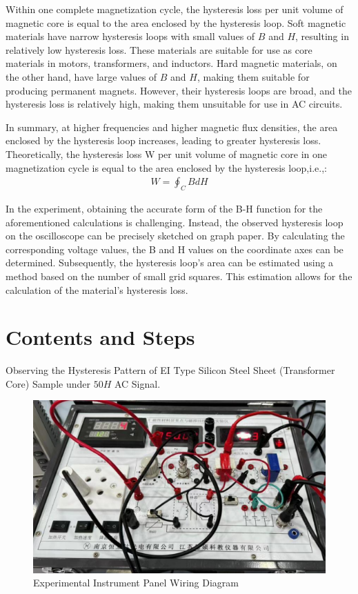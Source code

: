 \documentclass[UTF8]{article}
\begin{document}
      Within one complete magnetization cycle, the hysteresis loss per unit volume of magnetic core is equal to the area enclosed by the hysteresis loop. Soft magnetic materials have narrow hysteresis loops with small values of $B$ and $H$, resulting in relatively low hysteresis loss. These materials are suitable for use as core materials in motors, transformers, and inductors. Hard magnetic materials, on the other hand, have large values of $B$ and $H$, making them suitable for producing permanent magnets. However, their hysteresis loops are broad, and the hysteresis loss is relatively high, making them unsuitable for use in AC circuits.
      
      In summary, at higher frequencies and higher magnetic flux densities, the area enclosed by the hysteresis loop increases, leading to greater hysteresis loss. Theoretically, the hysteresis loss W per unit volume of magnetic core in one magnetization cycle is equal to the area enclosed by the hysteresis loop,i.e.,:
      \begin{eqnarray}
      W = \oint_{C}B dH
      \end{eqnarray}
      
      In the experiment, obtaining the accurate form of the B-H function for the aforementioned calculations is challenging. Instead, the observed hysteresis loop on the oscilloscope can be precisely sketched on graph paper. By calculating the corresponding voltage values, the B and H values on the coordinate axes can be determined. Subsequently, the hysteresis loop's area can be estimated using a method based on the number of small grid squares. This estimation allows for the calculation of the material's hysteresis loss.
      
               
	\section{Contents and Steps}

	Observing the Hysteresis Pattern of EI Type Silicon Steel Sheet (Transformer Core) Sample under $50H$ AC Signal.
	
     \begin{figure}[H]
           	    	\centering
           	    	\includegraphics[clip,scale=0.9,trim={0 0 0 0}]{fig/fig10.png}
           	        \caption{Experimental Instrument Panel Wiring Diagram}
           	        \label{figure.1}
               \end{figure}    
	
\end{document}
